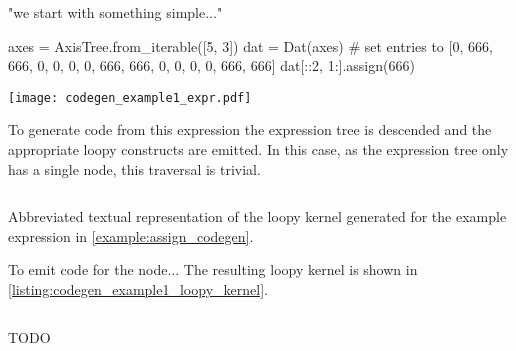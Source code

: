 \documentclass[thesis]{subfiles}
\begin{document}

\begin{example}
\label{example:assign_codegen}

"we start with something simple..."

\begin{pyinline}
  axes = AxisTree.from_iterable([5, 3])
  dat = Dat(axes)
  # set entries to [0, 666, 666, 0, 0, 0, 0, 666, 666, 0, 0, 0, 0, 666, 666]
  dat[::2, 1:].assign(666)
\end{pyinline}


\begin{center}
  \texttt{[image: codegen\_example1\_expr.pdf]}
\end{center}


To generate code from this expression the expression tree is descended and the appropriate loopy constructs are emitted.
In this case, as the expression tree only has a single node, this traversal is trivial.

\begin{listing}
  \centering
  \begin{minipage}{.9\textwidth}
    \inputminted{text}{./scripts/artefacts/codegen_example1_loopy_kernel_tidy.txt}
  \end{minipage}
  \caption{
    Abbreviated textual representation of the loopy kernel generated for the example expression in \cref{example:assign_codegen}.
  }
  \label{listing:codegen_example1_loopy_kernel}
\end{listing}

To emit code for the  node...
The resulting loopy kernel is shown in \cref{listing:codegen_example1_loopy_kernel}.

\begin{listing}
  \centering
  \begin{minipage}{.9\textwidth}
    \inputminted{c}{./scripts/artefacts/codegen_example1_c_code_tidy.c}
  \end{minipage}
  \caption{
    TODO
  }
  \label{listing:codegen_example1_c_code}
\end{listing}


\end{example}
\end{document}
